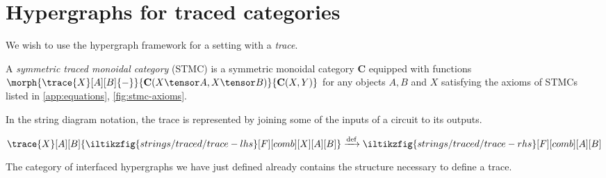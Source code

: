\section{Hypergraphs for traced categories}

We wish to use the hypergraph framework for a setting with a \emph{trace}.

\begin{definition}
    A \emph{symmetric traced monoidal category} (STMC) is a symmetric monoidal
    category \(\mathbf{C}\) equipped with functions \(
        \morph{
            \trace{X}[A][B]{-}
        }{
            \mathbf{C}(X \tensor A, X \tensor B)
        }{
            \mathbf{C}(X, Y)
        }
    \) for any objects \(A,B\) and \(X\) satisfying the axioms of STMCs listed
    in \cref{app:equations}, \cref{fig:stmc-axioms}.
\end{definition}

In the string diagram notation, the trace is represented by joining some of the
inputs of a circuit to its outputs.
%
\begin{center}
    \(
        \trace{X}[A][B]{\iltikzfig{strings/traced/trace-lhs}[F][comb][X][A][B]}
        \xrightarrow{\text{def}}
        \iltikzfig{strings/traced/trace-rhs}[F][comb][A][B]
    \)
\end{center}

The category of interfaced hypergraphs we have just defined already
contains the structure necessary to define a trace.

